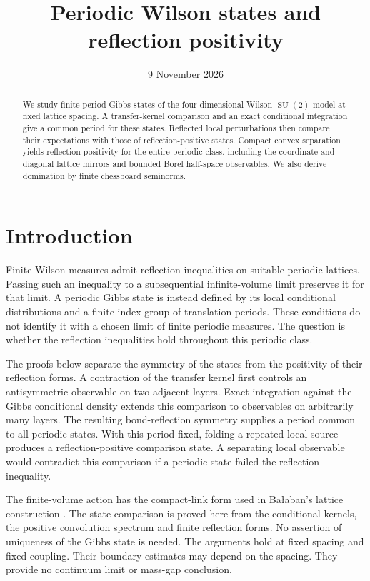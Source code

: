 \documentclass[11pt,letterpaper,reqno]{amsart}
\title[Periodic Wilson states and reflection positivity]{Periodic Wilson states and reflection positivity}
\date{9 November 2026}
\numberwithin{equation}{section}
\theoremstyle{definition}
\theoremstyle{remark}
\begin{document}
\raggedbottom
\begin{abstract}
We study finite-period Gibbs states of the four-dimensional Wilson
\(\operatorname{SU}(2)\) model at fixed lattice spacing. A transfer-kernel
comparison and an exact conditional integration give a common period
for these states. Reflected local perturbations then compare their
expectations with those of reflection-positive states. Compact convex
separation yields reflection positivity for the entire periodic class,
including the coordinate and diagonal lattice mirrors and bounded
Borel half-space observables. We also derive domination by finite
chessboard seminorms.
\end{abstract}
\maketitle
\tableofcontents

\section{Introduction}

Finite Wilson measures admit reflection inequalities on suitable
periodic lattices. Passing such an inequality to a subsequential
infinite-volume limit preserves it for that limit. A periodic Gibbs
state is instead defined by its local conditional distributions and
a finite-index group of translation periods. These conditions do not
identify it with a chosen limit of finite periodic measures. The
question is whether the reflection inequalities hold throughout this
periodic class.

The proofs below separate the symmetry of the states from the
positivity of their reflection forms. A contraction of the transfer
kernel first controls an antisymmetric observable on two adjacent
layers. Exact integration against the Gibbs conditional density
extends this comparison to observables on arbitrarily many layers.
The resulting bond-reflection symmetry supplies a period common to
all periodic states. With this period fixed, folding a repeated local
source produces a reflection-positive comparison state. A separating
local observable would contradict this comparison if a periodic
state failed the reflection inequality.

The finite-volume action has the compact-link form used in
Ba{\l}aban's lattice construction \cite[pp.~251--252]{Bal87}.
The state comparison is proved here from the conditional kernels,
the positive convolution spectrum and finite reflection forms.
No assertion of uniqueness of the Gibbs state is needed. The
arguments hold at fixed spacing and fixed coupling. Their boundary
estimates may depend on the spacing.
They provide no continuum limit or mass-gap conclusion.
\end{document}
